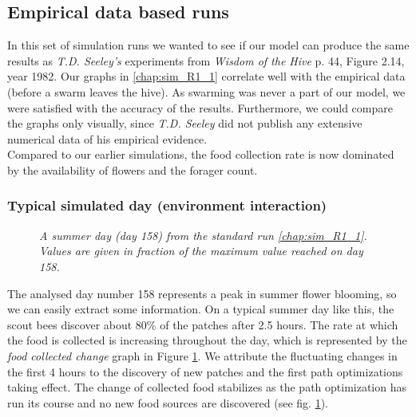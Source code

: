 \subsection{Empirical data based runs}
	In this set of simulation runs we wanted to see if our model can produce the same results as \textit{T.D. Seeley's} experiments from \textit{Wisdom of the Hive} p. 44, Figure  2.14, year 1982. Our graphs in \ref{chap:sim_R1_1} correlate well with the empirical data (before a swarm leaves the hive). As swarming was never a part of our model, we were satisfied with the accuracy of the results. Furthermore, we could compare the graphs only visually, since \textit{T.D. Seeley} did not publish any extensive numerical data of his empirical evidence.\\
	Compared to our earlier simulations, the food collection rate is now dominated by the availability of flowers and the forager count.
	
	\subsubsection{Typical simulated day (environment interaction)}
	
					\begin{figure}[H]
						\centering
						\caption{\textit{A summer day (day 158) from the standard run \ref{chap:sim_R1_1}. Values are given in fraction of the maximum value reached on day 158.}}
						\label{fig:day158}
					\end{figure}
					
		The analysed day number 158 represents a peak in summer flower blooming, so we can easily extract some information. On a typical summer day like this, the scout bees discover about $80\%$ of the patches after 2.5 hours. The rate at which the food is collected is increasing throughout the day, which is represented by the \textit{food collected change} graph in Figure \ref{fig:day158}. We attribute the fluctuating changes in the first 4 hours to the discovery of new patches and the first path optimizations taking effect. The change of collected food stabilizes as the path optimization has run its course and no new food sources are discovered (see fig. \ref{fig:day158}).\\
		

